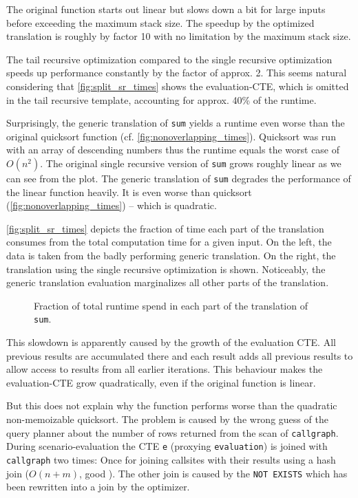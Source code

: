 The original function starts out linear but slows down a bit for large inputs before exceeding the maximum stack size. The speedup by the optimized translation is roughly by factor 10 with no limitation by the maximum stack size.

The tail recursive optimization compared to the single recursive optimization speeds up performance constantly by the factor of approx. 2. This seems natural considering that \autoref{fig:split_sr_times} shows the evaluation-CTE, which is omitted in the tail recursive template, accounting for approx. 40\% of the runtime.

Surprisingly, the generic translation of \texttt{sum} yields a runtime even worse than the original quicksort function (cf. \autoref{fig:nonoverlapping_times}). Quicksort was run with an array of descending numbers thus the runtime equals the worst case of $O(n^2)$. The original single recursive version of \texttt{sum} grows roughly linear as we can see from the plot. The generic translation of \texttt{sum} degrades the performance of the linear function heavily. It is even worse than quicksort (\autoref{fig:nonoverlapping_times}) -- which is quadratic.

\autoref{fig:split_sr_times} depicts the fraction of time each part of the translation consumes from the total computation time for a given input. On the left, the data is taken from the badly performing generic translation. On the right, the translation using the single recursive optimization is shown. Noticeably, the generic translation evaluation marginalizes all other parts of the translation.

\begin{figure}[h!]
    \centering\footnotesize
    
    \caption{Fraction of total runtime spend in each part of the translation of \texttt{sum}.}
    \label{fig:split_sr_times}
\end{figure}

This slowdown is apparently caused by the growth of the evaluation CTE. All previous results are accumulated there and each result adds all previous results to allow access to results from all earlier iterations. This behaviour makes the evaluation-CTE grow quadratically, even if the original function is linear.

But this does not explain why the function performs worse than the quadratic non-memoizable quicksort. The problem is caused by the wrong guess of the query planner about the number of rows returned from the scan of \texttt{callgraph}. During scenario-evaluation the CTE \texttt{e} (proxying \texttt{evaluation}) is joined with \texttt{callgraph} two times: Once for joining callsites with their results using a hash join ($O(n+m)$, good \cite[p. 463 ff.]{DMS}). The other join is caused by the \texttt{NOT EXISTS} which has been rewritten into a join by the optimizer.

